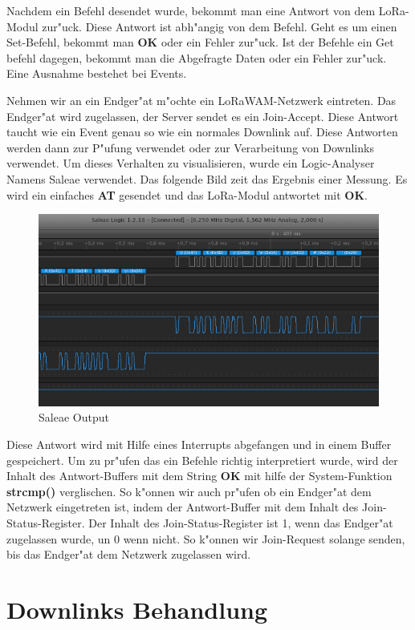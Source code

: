 Nachdem ein Befehl desendet wurde, bekommt man eine Antwort von dem LoRa-Modul zur"uck. Diese Antwort ist abh"angig von dem Befehl. Geht es um einen Set-Befehl, bekommt man \textbf{OK} oder ein Fehler zur"uck. Ist der Befehle ein Get befehl dagegen, bekommt man die Abgefragte Daten oder ein Fehler zur"uck. Eine Ausnahme bestehet bei Events.

Nehmen wir an ein Endger"at m"ochte ein LoRaWAM-Netzwerk eintreten. Das 
Endger"at wird zugelassen, der Server sendet es ein Join-Accept. Diese 
Antwort taucht wie ein Event genau so wie ein normales Downlink auf. 
Diese Antworten werden dann zur P"ufung verwendet oder zur Verarbeitung 
von Downlinks verwendet. Um dieses Verhalten zu visualisieren, wurde 
ein Logic-Analyser Namens Saleae \cite{analyzer} verwendet. Das 
folgende Bild zeit das Ergebnis einer Messung. Es wird ein einfaches 
\textbf{AT} gesendet und das LoRa-Modul antwortet mit \textbf{OK}.

\begin{figure}[h]
	\centering
	\includegraphics[width=16cm]{source/images/saleae}
	\caption{Saleae Output\label{fig:saleae}}
\end{figure}

\vspace{5cm}
Diese Antwort wird mit Hilfe eines Interrupts abgefangen und in einem 
Buffer gespeichert. Um zu pr"ufen das ein Befehle richtig interpretiert wurde, wird der Inhalt des Antwort-Buffers mit dem String \textbf{OK} mit hilfe der System-Funktion \textbf{strcmp()} verglischen. So k"onnen wir auch pr"ufen ob ein Endger"at dem Netzwerk eingetreten ist, indem der Antwort-Buffer mit dem Inhalt des Join-Status-Register. Der Inhalt des Join-Status-Register ist 1, wenn das Endger"at zugelassen wurde, un 0 wenn nicht. So k"onnen wir Join-Request solange senden, bis das Endger"at dem Netzwerk zugelassen wird.


\section{Downlinks Behandlung} 